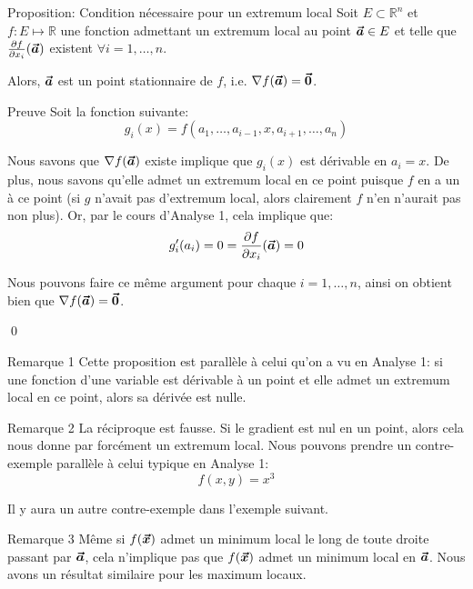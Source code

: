 \documentclass[a4paper]{article}
\begin{document}
\begin{parag}{Proposition: Condition nécessaire pour un extremum local}
    Soit $E \subset \mathbb{R}^n$ et $f: E \mapsto \mathbb{R}$ une fonction admettant un extremum local au point $\bm{\protect\vec{a}} \in E$ et telle que $\frac{\partial f}{\partial x_i}\left(\bvec{a}\right)$ existent $\forall i = 1, \ldots, n$. 

    Alors, $\bm{\protect\vec{a}}$ est un point stationnaire de $f$, i.e. $\nabla f\left(\bvec{a}\right) = \bvec{0}$.

    \begin{subparag}{Preuve}
        Soit la fonction suivante:
        \[g_i\left(x\right) = f\left(a_1, \ldots, a_{i-1}, x, a_{i+1}, \ldots, a_n\right)\]

        Nous savons que $\nabla f\left(\bvec{a}\right)$ existe implique que $g_i\left(x\right)$ est dérivable en $a_i = x$. De plus, nous savons qu'elle admet un extremum local en ce point puisque $f$ en a un à ce point (si $g$ n'avait pas d'extremum local, alors clairement $f$ n'en n'aurait pas non plus). Or, par le cours d'Analyse 1, cela implique que:
        \[g'_i\left(a_i\right) = 0 = \frac{\partial f}{\partial x_i}\left(\bvec{a}\right) = 0\]

        Nous pouvons faire ce même argument pour chaque $i = 1, \ldots, n$, ainsi on obtient bien que $\nabla f\left(\bvec{a}\right) = \bvec{0}$.

        \qed
    \end{subparag}

    \begin{subparag}{Remarque 1}
        Cette proposition est parallèle à celui qu'on a vu en Analyse 1: si une fonction d'une variable est dérivable à un point et elle admet un extremum local en ce point, alors sa dérivée est nulle.
    \end{subparag}

    \begin{subparag}{Remarque 2}
        La réciproque est fausse. Si le gradient est nul en un point, alors cela nous donne par forcément un extremum local. Nous pouvons prendre un contre-exemple parallèle à celui typique en Analyse 1: 
        \[f\left(x, y\right) = x^3\]

        Il y aura un autre contre-exemple dans l'exemple suivant.
    \end{subparag}

    \begin{subparag}{Remarque 3}
        Même si $f\left(\bvec{x}\right)$ admet un minimum local le long de toute droite passant par $\bm{\protect\vec{a}}$, cela n'implique pas que $f\left(\bvec{x}\right)$ admet un minimum local en $\bm{\protect\vec{a}}$. Nous avons un résultat similaire pour les maximum locaux.
    \end{subparag}
\end{parag}
\end{document}
